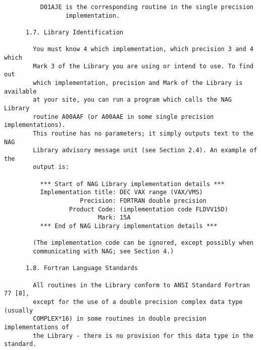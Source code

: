 \begin{small}
\begin{verbatim}
          D01AJE is the corresponding routine in the single precision             
                 implementation.                                                  
                                                                                  
      1.7. Library Identification                                                 
                                                                                  
        You must know 4 which implementation, which precision 3 and 4 which       
        Mark 3 of the Library you are using or intend to use. To find out         
        which implementation, precision and Mark of the Library is available      
        at your site, you can run a program which calls the NAG Library           
        routine A00AAF (or A00AAE in some single precision implementations).      
        This routine has no parameters; it simply outputs text to the NAG         
        Library advisory message unit (see Section 2.4). An example of the        
        output is:                                                                
                                                                                  
          *** Start of NAG Library implementation details ***                     
          Implementation title: DEC VAX range (VAX/VMS)                           
                     Precision: FORTRAN double precision                          
                  Product Code: (implementation code FLDVV15D)                    
                          Mark: 15A                                               
          *** End of NAG Library implementation details ***                       
                                                                                  
        (The implementation code can be ignored, except possibly when             
        communicating with NAG; see Section 4.)                                   
                                                                                  
      1.8. Fortran Language Standards                                             
                                                                                  
        All routines in the Library conform to ANSI Standard Fortran 77 [8],      
        except for the use of a double precision complex data type (usually       
        COMPLEX*16) in some routines in double precision implementations of       
        the Library - there is no provision for this data type in the standard.   
                                                                                  

\end{verbatim}
\end{small}
